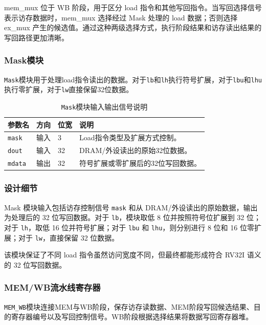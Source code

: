 \documentclass[UTF8,a4paper,12pt]{ctexart}
\newcommand{\code}[1]{\texttt{#1}}
\begin{document}
mem\_mux 位于 WB 阶段，用于区分 load 指令和其他写回指令。当写回选择信号表示访存数据时，mem\_mux 选择经过 Mask 处理的 load 数据；否则选择 ex\_mux 产生的候选值。通过这种两级选择方式，执行阶段结果和访存读出结果的写回路径更加清晰。

\subsubsection{Mask模块}

\code{Mask}模块用于处理load指令读出的数据。对于\code{lb}和\code{lh}执行符号扩展，对于\code{lbu}和\code{lhu}执行零扩展，对于\code{lw}直接保留32位数据。

\begin{table}[H]
\centering
\caption{\code{Mask}模块输入输出信号说明}
\footnotesize
\renewcommand{\arraystretch}{1.15}
\begin{tabularx}{\textwidth}{p{3.2cm}p{1.5cm}p{2.1cm}X}
\toprule
参数名 & 方向 & 位宽 & 说明 \\
\midrule
\code{mask} & 输入 & 3 & Load指令类型及扩展方式控制。 \\
\code{dout} & 输入 & 32 & DRAM/外设读出的原始32位数据。 \\
\code{mdata} & 输出 & 32 & 符号扩展或零扩展后的32位写回数据。 \\
\bottomrule
\end{tabularx}
\end{table}

\subsubsection*{设计细节}

Mask 模块输入包括访存控制信号 \code{mask} 和从 DRAM/外设读出的原始数据，输出为处理后的 32 位写回数据。对于 \code{lb}，模块取低 8 位并按照符号位扩展到 32 位；对于 \code{lh}，取低 16 位并符号扩展；对于 \code{lbu} 和 \code{lhu}，则分别进行 8 位和 16 位零扩展；对于 \code{lw}，直接保留 32 位数据。

该模块保证了不同 load 指令虽然访问宽度不同，但最终都能形成符合 RV32I 语义的 32 位写回数据。

\subsubsection{MEM/WB流水线寄存器}

\code{MEM\_WB}模块连接MEM与WB阶段，保存访存读数据、MEM阶段写回候选结果、目的寄存器编号以及写回控制信号。WB阶段根据选择结果将数据写回寄存器堆。
\end{document}
